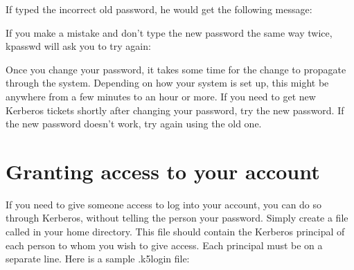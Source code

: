 \documentclass[letterpaper,10pt,english]{sphinxmanual}
\begin{document}
If  typed the incorrect old password, he would get the
following message:

%
\begin{sphinxVerbatim}[commandchars=\\\{\}]
 
         
      
\end{sphinxVerbatim}

If you make a mistake and don’t type the new password the same way
twice, kpasswd will ask you to try again:

%
\begin{sphinxVerbatim}[commandchars=\\\{\}]
 
        
        
        
     
\end{sphinxVerbatim}

Once you change your password, it takes some time for the change to
propagate through the system.  Depending on how your system is set up,
this might be anywhere from a few minutes to an hour or more.  If you
need to get new Kerberos tickets shortly after changing your password,
try the new password.  If the new password doesn’t work, try again
using the old one.


\section{Granting access to your account}
\label{\detokenize{user/pwd_mgmt:grant-access}}\label{\detokenize{user/pwd_mgmt:granting-access-to-your-account}}
If you need to give someone access to log into your account, you can
do so through Kerberos, without telling the person your password.
Simply create a file called {\hyperref[\detokenize{user/user_config/k5login:k5login-5}]{}} in your home directory.
This file should contain the Kerberos principal of each person to whom
you wish to give access.  Each principal must be on a separate line.
Here is a sample .k5login file:
\end{document}
